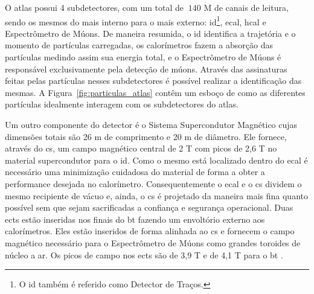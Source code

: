 O \gls{atlas} possui 4 subdetectores, com um total de $~140$ M de canais de
leitura, sendo os mesmos do mais interno para o mais externo: 
\gls{id}\footnote{O \gls{id} também é referido como Detector de Traços.}, \gls{ecal}, 
\gls{hcal} e Espectrômetro de Múons. De maneira resumida, o \gls{id} identifica a
trajetória e o momento de partículas carregadas, os calorímetros fazem a
absorção das partículas medindo assim sua energia total, e o Espectrômetro de
Múons é responsável exclusivamente pela detecção de múons.
Através das assinaturas feitas pelas partículas nesses 
subdetectores é possível realizar a identificação das mesmas. 
A Figura~\ref{fig:particulas_atlas} contêm um esboço de como as diferentes 
partículas idealmente interagem com os subdetectores do \gls{atlas}. 


Um outro componente do detector é o Sistema Supercondutor Magnético cujas
dimensões totais são 26 m de comprimento e 20 m de diâmetro. 
Ele fornece, através do \gls{cs}, um campo magnético central de 2 T com picos de 2,6 T 
no material supercondutor para o \gls{id}. Como o mesmo está
localizado dentro do \gls{ecal} é necessário uma minimização cuidadosa do
material de forma a obter a performance desejada no calorímetro. 
Consequentemente o \gls{ecal} e o \gls{cs} dividem o mesmo recipiente de vácuo e,
ainda, o \gls{cs} é projetado da maneira mais fina quanto possível sem que sejam
sacrificadas a confiança e segurança operacional.
Duas \glspl{ect} estão inseridas nos finais do \gls{bt} fazendo um
envoltório externo aos calorímetros. Eles estão inseridos de forma alinhada ao \gls{cs} 
e fornecem o campo magnético necessário para o Espectrômetro de Múons como grandes toroides 
de núcleo a ar. Os picos de campo nos \glspl{ect} são de
3,9 T e de 4,1 T para o \gls{bt} \cite{ATLAS_TDR}.


